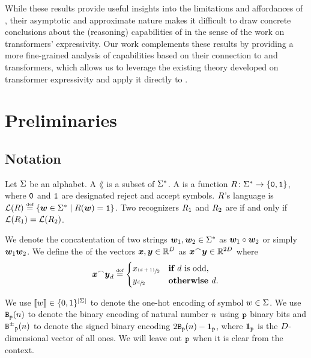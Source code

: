 While these results provide useful insights into the limitations and affordances of \MDMsAcr, their asymptotic and approximate nature makes it difficult to draw concrete conclusions about the (reasoning) capabilities of \MDMsAcr in the sense of the work on transformers' expressivity.
Our work complements these results by providing a more fine-grained analysis of \MDMAcr capabilities based on their connection to \LTsAcr and \CoTAcr transformers, which allows us to leverage the existing theory developed on transformer expressivity and apply it directly to \MDMsAcr.

\section{Preliminaries} \label{app:preliminaries}

\subsection{Notation} \label{app:notation}

Let ${{\Sigma}}$ be an alphabet.
A  $\lang$ is a subset of ${{{{{{\Sigma}}^{*}}}}}$.
A  is a function ${R}\colon {{{{{{\Sigma}}^{*}}}}} \to \{{\texttt{0}}, {\texttt{1}}\}$, where ${\texttt{0}}$ and ${\texttt{1}}$ are designated reject and accept symbols. 
${R}$'s language is $\langFun{\recognizer} \defeq \set{\str \in \strings \mid \recognizerFun{\str} = \acceptSym}$.
Two recognizers ${R}_1$ and ${R}_2$ are  if and only if $\langFun{\recognizer_1} = \langFun{\recognizer_2}$.

We denote the concatentation of two strings ${{\boldsymbol{w}}}_1, {{\boldsymbol{w}}}_2 \in {{{{{{\Sigma}}^{*}}}}}$ as ${{\boldsymbol{w}}}_1 \circ {{\boldsymbol{w}}}_2$ or simply ${{\boldsymbol{w}}}_1{{\boldsymbol{w}}}_2$.
We define the  of the vectors ${{{\bm{x}}}}, {{{\bm{y}}}} \in {{\mathbb{R}}}^{{D}}$ as ${{{{{\bm{x}}}}}^\frown{{{{\bm{y}}}}}} \in {{\mathbb{R}}}^{2{{D}}}$ where 
\begin{equation}
   {{{{{\bm{x}}}}}^\frown{{{{\bm{y}}}}}}_{{d}} \mathrel{\stackrel{\textnormal{\tiny def}}{=}} 
   \begin{cases}
      {{{x}}}_{\sfrac{({{d}}+1)}{2}} & \textbf{if } {{d}} \text{ is odd}, \\
      {{{y}}}_{\sfrac{{{d}}}{2}} & \textbf{otherwise } {{d}}.
   \end{cases}
\end{equation}

We use ${{\llbracket{{w}}\rrbracket}} \in \{0, 1\}^{{{|{{\Sigma}}|}}}$ to denote the one-hot encoding of symbol ${{w}} \in {{\Sigma}}$.
We use ${\texttt{B}}_{{\texttt{p}}}({{n}})$ to denote the binary encoding of natural number ${{n}}$ using ${{\texttt{p}}}$ binary bits and ${{\texttt{B}}^{\pm}}_{{\texttt{p}}}({{n}})$ to denote the signed binary encoding $2{\texttt{B}}_{{\texttt{p}}}({{n}})-{{\bm{1}}}_{{\texttt{p}}}$, where ${{\bm{1}}}_{{\texttt{p}}}$ is the ${{D}}$-dimensional vector of all ones.
We will leave out ${{\texttt{p}}}$ when it is clear from the context.

